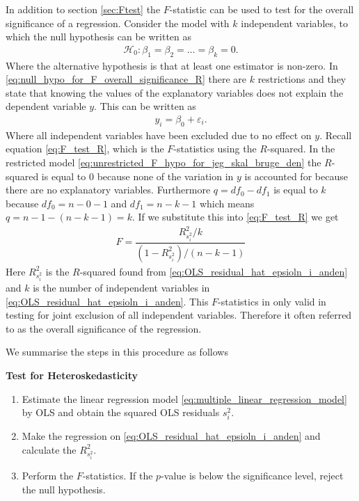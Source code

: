 In addition to section \ref{sec:Ftest} the $F$-statistic can be used to test for the overall significance of a regression. 
Consider the model with $k$ independent variables, to which the null hypothesis can be written as
\begin{align}\label{eq:null_hypo_for_F_overall_significance_R}
    \mathcal{H}_0: \beta_1 = \beta_2 = \ldots = \beta_k = 0.
\end{align}
Where the alternative hypothesis is that at least one estimator is non-zero. In \eqref{eq:null_hypo_for_F_overall_significance_R} there are $k$ restrictions and they state that knowing the values of the explanatory variables does not explain the dependent variable $y$. This can be written as
\begin{align}\label{eq:unrestricted_F_hypo_for_jeg_skal_bruge_den}
    y_i = \beta_0 + \varepsilon_i.
\end{align}
Where all independent variables have been excluded due to no effect on $y$. 
Recall equation \eqref{eq:F_test_R}, which is the $F$-statistics using the $R$-squared. 
In the restricted model \eqref{eq:unrestricted_F_hypo_for_jeg_skal_bruge_den} the $R$-squared is equal to $0$ because none of the variation in $y$ is accounted for because there are no explanatory variables. 
Furthermore $q = df_0 - df_{1}$ is equal to $k$ because $df_0 = n-0-1$ and $df_{1} = n-k-1$ which means $q = n-1 - (n-k-1) = k$. 
If we substitute this into \eqref{eq:F_test_R} we get
\begin{align}\label{eq:udvidelse_til_F_stat}
    F = \dfrac{R^2_{s_i^2}/k}{(1-R^2_{s_i^2}) / (n-k-1)}
\end{align}
Here $R^2_{s_i^2}$ is the $R$-squared found from \eqref{eq:OLS_residual_hat_epsioln_i_anden} and $k$ is the number of independent variables in \eqref{eq:OLS_residual_hat_epsioln_i_anden}.
This $F$-statistics in only valid in testing for joint exclusion of all independent variables. 
Therefore it often referred to as the overall significance of the regression. 

We summarise the steps in this procedure as follows

\textbf{Test for Heteroskedasticity}
\begin{enumerate}[label=(\roman*)]
    \item Estimate the linear regression model \eqref{eq:multiple_linear_regression_model} by OLS and obtain the squared OLS residuals $s_i^2$. 
    \item Make the regression on \eqref{eq:OLS_residual_hat_epsioln_i_anden} and calculate the $R^2_{s_i^2}$. 
    \item Perform the $F$-statistics. If the $p$-value is below the significance level, reject the null hypothesis. 
\end{enumerate}


